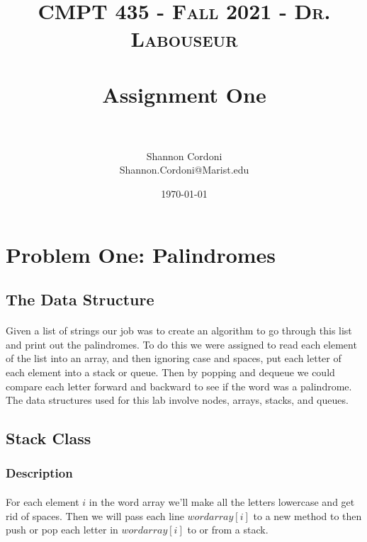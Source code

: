 \documentclass[letterpaper, 10pt,DIV=13]{scrartcl}
\title{	
   \normalfont \normalsize 
   \textsc{CMPT 435 - Fall 2021 - Dr. Labouseur} \\[10pt] %
   \horrule{0.5pt} \\[0.25cm] 	%
   \huge Assignment One  \\     	    %
   \horrule{0.5pt} \\[0.25cm] 	%
}
\author{Shannon Cordoni \\ \normalsize Shannon.Cordoni@Marist.edu}
\date{\normalsize\today} 	%
\numberwithin{equation}{section} %
\numberwithin{figure}{section} %
\numberwithin{table}{section} %
\begin{document}
\maketitle %

\section{Problem One: Palindromes}

\subsection{The Data Structure}
\paragraph{} Given a list of strings our job was to create an algorithm to go through this list and print out the palindromes. To do this we were assigned to read each element of the list into an array, and then ignoring case and spaces, put each letter of each element into a stack or queue. Then by popping and dequeue we could compare each letter forward and backward to see if the word was a palindrome.\\

The data structures used for this lab involve nodes, arrays, stacks, and queues.

\subsection{Stack Class}

\subsubsection{Description}
\paragraph{}For each element $i$ in the word array we'll make all the letters lowercase and get rid of spaces. Then we will pass each line $wordarray[i]$ to a new method to then push or pop each letter in $wordarray[i]$ to or from a stack.
\end{document}
